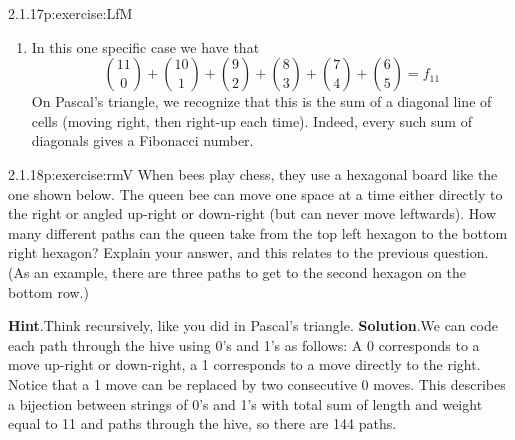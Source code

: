 \documentclass[twoside,11pt,]{book}
\newcommand{\blocktitlefont}{\relax}
\numberwithin{equation}{chapter}
\begin{document}
\begin{divisionsolution}{2.1.17}{}{p:exercise:LfM}
\begin{enumerate}[label=(\alph*)]
\item{}In this one specific case we have that%
\begin{equation*}
{11\choose 0} + {10 \choose 1} + {9 \choose 2} + {8 \choose 3} + {7 \choose 4} + {6 \choose 5} = f_{11}
\end{equation*}
On Pascal's triangle, we recognize that this is the sum of a diagonal line of cells (moving right, then right-up each time). Indeed, every such sum of diagonals gives a Fibonacci number.%
\end{enumerate}
%
\end{divisionsolution}%
\begin{divisionsolution}{2.1.18}{}{p:exercise:rmV}%
When bees play chess, they use a hexagonal board like the one shown below. The queen bee can move one space at a time either directly to the right or angled up-right or down-right (but can never move leftwards). How many different paths can the queen take from the top left hexagon to the bottom right hexagon? Explain your answer, and this relates to the previous question. (As an example, there are three paths to get to the second hexagon on the bottom row.)%
\begin{sidebyside}{1}{0.15}{0.15}{0}%
\begin{sbspanel}{0.7}%
%
\end{sbspanel}%
\end{sidebyside}%
\par\smallskip%
\noindent\textbf{\blocktitlefont Hint}.\quad{}Think recursively, like you did in Pascal's triangle.%
\textbf{\blocktitlefont Solution}.\quad{}We can code each path through the hive using 0's and 1's as follows: A 0 corresponds to a move up-right or down-right, a 1 corresponds to a move directly to the right. Notice that a 1 move can be replaced by two consecutive 0 moves. This describes a bijection between strings of 0's and 1's with total sum of length and weight equal to 11 and paths through the hive, so there are 144 paths.%
\end{divisionsolution}%
\end{document}
